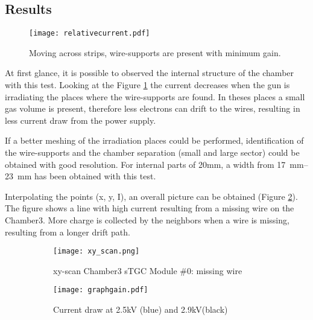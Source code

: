 \subsection{Results}

\begin{figure}[ht]
	\centering
		\hspace*{\fill}
	\texttt{[image: relativecurrent.pdf]}
		\hspace*{\fill}
		\captionsetup{margin=1cm}
	\caption{Moving across strips, wire-supports are present with minimum gain.}\label{fig:structure}
\end{figure}

At first glance, it is possible to observed the internal structure of the chamber with this test. Looking at the Figure
\ref{fig:structure} the current decreases when the gun is irradiating the places where the wire-supports are found. In
theses places a small gas volume is present, therefore less electrons can drift to the wires, resulting in less current
draw from the power supply.\par

If a better meshing of the irradiation places could be performed, identification of the wire-supports and the chamber
separation (small and large sector) could be obtained with good resolution. For internal parts of 20mm, a width from
\SIrange{17}{23}{mm} has been obtained with this test.\par

Interpolating the points (x, y, I), an overall picture can be obtained (Figure \ref{fig:xyscan}). The figure shows a line
with high current resulting from a missing wire on the Chamber3. More charge is collected by the neighbors when a wire
is missing, resulting from a longer drift path.\par

\begin{figure}[ht]
		\centering
		\hspace*{\fill}
		\begin{subfigure}[b]{0.45\textwidth}
			\centering
			\texttt{[image: xy\_scan.png]}
			\caption{xy-scan Chamber3 sTGC Module \#0: missing wire}\label{fig:xyscan}
		\end{subfigure}
		\hfill
		\begin{subfigure}[b]{0.45\textwidth}
			\centering
			\texttt{[image: graphgain.pdf]}
			\caption{Current draw at 2.5kV (blue) and 2.9kV(black)}\label{fig:draw}
		\end{subfigure}
		\hspace*{\fill}
		\caption{ }\label{}
\end{figure}


